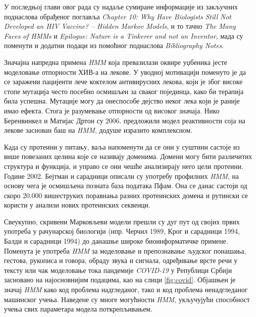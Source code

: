 \documentclass[12pt,oneside]{memoir}
\begin{document}
\begin{CJK}{UTF8}{ipxm}
У последњој глави овог рада су надаље сумиране информације из закључних поднаслова обрађеног поглавља \textit{Chapter 10: Why Have Biologists Still Not Developed an HIV Vaccine? -- Hidden Markov Models}, и то тачно \textit{The Many Faces of HMMs} и \textit{Epilogue: Nature is a Tinkerer and not an Inventor}, мада су поменути и додатни подаци из помоћног поднаслова \textit{Bibliography Notes}.

Значајна напредна примена \textit{HMM} која превазилази оквире уџбеника јесте моделовање отпорности ХИВ-а на лекове. У уводној мотивацији поменуто је да се заражени пацијенти лече коктелом антивирусних лекова, који је због високе стопе мутација често посебно осмишљен за сваког појединца, како би терапија била успешна. Мутације могу да онеспособе дејство неког лека који је раније имао ефекта. Стога је разумевање отпорности од високог значаја. Нико Беренвинкел и Матијас Дртон су 2006. предложили модел реактивности соја на лекове заснован баш на \textit{HMM}, додуше изразито комплексном\cite{beerenwinkel2007}.

Када су протеини у питању, ваља напоменути да се они у суштини састоје из више повезаних целина које се називају доменима. Домени могу бити различитих структура и функција, и управо се они чешће анализирају него цели протеини. Године 2002. Бејтман и сарадници описали су употребу профилних \textit{HMM}, на основу чега је осмишљена позната база података Пфам\cite{bateman2002}. Она се данас састоји од скоро 20.000 вишеструких поравнања разних протеинских домена и рутински се користи у анализи нових протеинских секвенци\cite{pfam}.

Свеукупно, скривени Марковљеви модели прешли су дуг пут од својих првих употреба у рачунарској биологији (нпр. Черчил 1989\cite{churchill1989}, Крог и сарадници 1994\cite{krogh1994}, Балди и сарадници 1994\cite{baldi1994}) до данашње широке биоинформатичке примене. Поменута је употреба \textit{HMM} за моделовање и препознавање људског понашања, гестова, рукописа и говора, обраду звука и сигнала, одређивање врсте речи у тексту или чак моделовање тока пандемије \textit{COVID-19} у Републици Србији засновано на најосновнијим подацима, као на слици \ref{fig:covid}. Објашњен је значај \textit{HMM} како код проблема надгледаног, тако и код проблема ненадгледаног машинског учења. Наведене су многе могућности \textit{HMM}, укључујући способност учења свих параметара модела поткрепљивањем.


\end{CJK}
\end{document}
